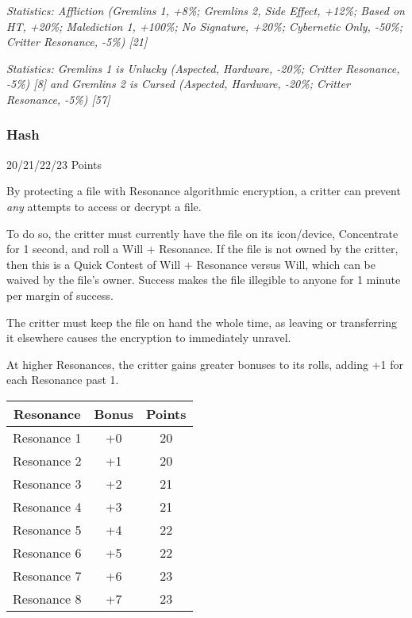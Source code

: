\begin{multicols*}{3}
	\textcolor{OliveGreen}{\textit{Statistics: Affliction (Gremlins 1, +8\%; Gremlins 2, Side Effect, +12\%; Based on HT, +20\%; Malediction 1, +100\%; No Signature, +20\%; Cybernetic Only, -50\%; Critter Resonance, -5\%) [21]}}
	
	\textcolor{OliveGreen}{\textit{Statistics: Gremlins 1 is Unlucky (Aspected, Hardware, -20\%; Critter Resonance, -5\%) [8] and Gremlins 2 is Cursed (Aspected, Hardware, -20\%; Critter Resonance, -5\%) [57]}}

	\subsubsection{Hash}\label{hash}
	\begin{flushright}
		20/21/22/23 Points
	\end{flushright}

	By protecting a file with Resonance algorithmic encryption, a critter can prevent \textit{any} attempts to access or decrypt a file.
	
	To do so, the critter must currently have the file on its icon/device, Concentrate for 1 second, and roll a Will + Resonance. If the file is not owned by the critter, then this is a Quick Contest of Will + Resonance versus Will, which can be waived by the file's owner. Success makes the file illegible to anyone for 1 minute per margin of success.
	
	The critter must keep the file on hand the whole time, as leaving or transferring it elsewhere causes the encryption to immediately unravel.
	
	At higher Resonances, the critter gains greater bonuses to its rolls, adding +1 for each Resonance past 1.
	
	\begin{center}
		\begin{tabular}{|c|c|c|}
			\hline
			Resonance & Bonus & Points \\
			\hline
			\hline
			Resonance 1 & +0 & 20 \\
			Resonance 2 & +1 & 20 \\
			Resonance 3 & +2 & 21 \\
			Resonance 4 & +3 & 21 \\
			Resonance 5 & +4 & 22 \\
			Resonance 6 & +5 & 22 \\
			Resonance 7 & +6 & 23 \\
			Resonance 8 & +7 & 23 \\
			\hline
		\end{tabular}
	\end{center}


\end{multicols*}
